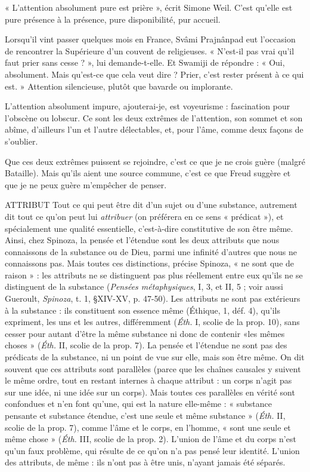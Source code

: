 « L’attention absolument pure est prière », écrit Simone Weil. C’est qu’elle
est pure présence à la présence, pure disponibilité, pur accueil.

Lorsqu'il vint passer quelques mois en France, Svâmi Prajnânpad eut
l’occasion de rencontrer la Supérieure d’un couvent de religieuses. « N’est-il pas
vrai qu’il faut prier sans cesse ? », lui demande-t-elle. Et Swamiji de répondre :
« Oui, absolument. Mais qu'est-ce que cela veut dire ? Prier, c’est rester présent
à ce qui est. » Attention silencieuse, plutôt que bavarde ou implorante.

L’attention absolument impure, ajouterai-je, est voyeurisme : fascination
pour l’obscène ou lobscur. Ce sont les deux extrêmes de l'attention, son
sommet et son abîme, d’ailleurs l’un et l’autre délectables, et, pour l’âme,
comme deux façons de s’oublier.

Que ces deux extrêmes puissent se rejoindre, c’est ce que je ne crois guère
(malgré Bataille). Mais qu’ils aient une source commune, c’est ce que Freud
suggère et que je ne peux guère m'empêcher de penser.

ATTRIBUT Tout ce qui peut être dit d’un sujet ou d’une substance, autrement
dit tout ce qu’on peut lui {\it attribuer} (on préférera en ce
sens « prédicat »), et spécialement une qualité essentielle, c’est-à-dire constitutive
de son être même. Ainsi, chez Spinoza, la pensée et l’étendue sont les deux
attributs que nous connaissons de la substance ou de Dieu, parmi une infinité
d’autres que nous ne connaissons pas. Mais toutes ces distinctions, précise Spinoza,
« ne sont que de raison » : les attributs ne se distinguent pas plus réellement
entre eux qu'ils ne se distinguent de la substance ({\it Pensées métaphysiques},
I, 3, et II, 5 ; voir aussi Gueroult, {\it Spinoza}, t. 1, \S XIV-XV, p. 47-50). Les attributs
ne sont pas extérieurs à la substance : ils constituent son essence même
({\it }Éthique, 1, déf. 4), qu’ils expriment, les uns et les autres, différemment ({\it Éth.} I,
scolie de la prop. 10), sans cesser pour autant d’être la même substance ni donc
de contenir «les mêmes choses » ({\it Éth.} II, scolie de la prop. 7). La pensée et
l'étendue ne sont pas des prédicats de la substance, ni un point de vue sur elle,
mais son être même. On dit souvent que ces attributs sont parallèles (parce que
les chaînes causales y suivent le même ordre, tout en restant internes à chaque
attribut : un corps n’agit pas sur une idée, ni une idée sur un corps). Mais
toutes ces parallèles en vérité sont confondues et n’en font qu’une, qui est la
nature elle-même : « substance pensante et substance étendue, c’est une seule et
même substance » ({\it Éth.} II, scolie de la prop. 7), comme l’âme et le corps, en
l’homme, « sont une seule et même chose » ({\it Éth.} III, scolie de la prop. 2).
L'union de l’âme et du corps n’est qu’un faux problème, qui résulte de ce qu'on
n’a pas pensé leur identité. L'union des attributs, de même : ils n’ont pas à être
unis, n’ayant jamais été séparés.

